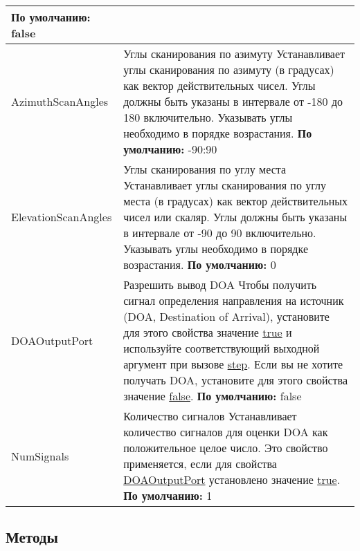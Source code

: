 \begin{longtable}{|p{6cm}|p{11cm}|}
	\newline
	\textbf{По умолчанию:} false \\
	\hline
	AzimuthScanAngles
	&
	Углы сканирования по азимуту
	\newline
	\newline
	Устанавливает углы сканирования по азимуту (в градусах) как вектор действительных чисел. Углы должны быть указаны в интервале от -180 до 180 включительно. Указывать углы необходимо в порядке возрастания.
	\newline
	\newline
	\textbf{По умолчанию:} -90:90 \\
	\hline
	ElevationScanAngles
	&
	Углы сканирования по углу места
	\newline
	\newline
	Устанавливает углы сканирования по углу места (в градусах) как вектор действительных чисел или скаляр. Углы должны быть указаны в интервале от -90 до 90 включительно. Указывать углы необходимо в порядке возрастания.
	\newline
	\newline
	\textbf{По умолчанию:} 0 \\
	\hline
	DOAOutputPort
	&
	Разрешить вывод DOA
	\newline
	\newline
	Чтобы получить сигнал определения направления на источник (DOA, Destination of Arrival), установите для этого свойства значение \underline{true} и используйте соответствующий выходной аргумент при вызове \underline{step}. Если вы не хотите получать DOA, установите для этого свойства значение \underline{false}.
	\newline
	\newline
	\textbf{По умолчанию:} false \\
	\hline
	
	NumSignals
	&
	Количество сигналов
	\newline
	\newline
	Устанавливает количество сигналов для оценки DOA как положительное целое число. Это свойство применяется, если для свойства \underline{DOAOutputPort} установлено значение \underline{true}.
	\newline
	\newline
	\textbf{По умолчанию:} 1 \\
	\hline
\end{longtable}

\subsection{Методы}

